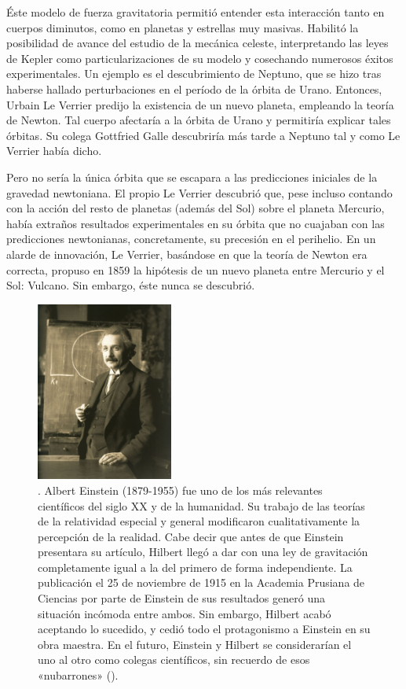 \documentclass[11pt,a4paper,titlepage]{article}
\begin{document}
Éste modelo de fuerza gravitatoria permitió entender esta interacción tanto en cuerpos diminutos, como en planetas y estrellas muy masivas. Habilitó la posibilidad de avance del estudio de la mecánica celeste, interpretando las leyes de Kepler como particularizaciones de su modelo y cosechando numerosos éxitos experimentales. Un ejemplo es el descubrimiento de Neptuno, que se hizo tras haberse hallado perturbaciones en el período de la órbita de Urano. Entonces, Urbain Le Verrier predijo la existencia de un nuevo planeta, empleando la teoría de Newton. Tal cuerpo afectaría a la órbita de Urano y permitiría explicar tales órbitas. Su colega Gottfried Galle descubriría más tarde a Neptuno tal y como Le Verrier había dicho.

Pero no sería la única órbita que se escapara a las predicciones iniciales de la gravedad newtoniana. El propio Le Verrier descubrió que, pese incluso contando con la acción del resto de planetas (además del Sol) sobre el planeta Mercurio, había extraños resultados experimentales en su órbita que no cuajaban con las predicciones newtonianas, concretamente, su precesión en el perihelio. En un alarde de innovación, Le Verrier, basándose en que la teoría de Newton era correcta, propuso en 1859 la hipótesis de un nuevo planeta entre Mercurio y el Sol: Vulcano. Sin embargo, éste nunca se descubrió.

\begin{figure}
	\centering
	\includegraphics[width=0.40\textwidth]{einstein}
	\caption{\cite{einsteinbib}. Albert Einstein (1879-1955) fue uno de los más relevantes científicos del siglo XX y de la humanidad. Su trabajo de las teorías de la relatividad especial y general modificaron cualitativamente la percepción de la realidad. Cabe decir que antes de que Einstein presentara su artículo, Hilbert llegó a dar con una ley de gravitación completamente igual a la del primero de forma independiente. La publicación el 25 de noviembre de 1915 en la Academia Prusiana de Ciencias por parte de Einstein de sus resultados generó una situación incómoda entre ambos. Sin embargo, Hilbert acabó aceptando lo sucedido, y cedió todo el protagonismo a Einstein en su obra maestra. En el futuro, Einstein y Hilbert se considerarían el uno al otro como colegas científicos, sin recuerdo de esos «nubarrones» (\cite[p.~49-50]{teoriaperfecta}).}
	\label{fig:einstein}
\end{figure}
\end{document}
